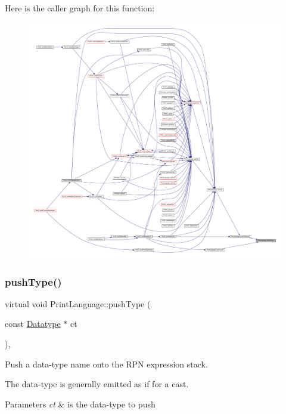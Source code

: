Here is the caller graph for this function\+:
\nopagebreak
\begin{figure}[H]
\begin{center}
\leavevmode
\includegraphics[width=350pt]{class_print_language_a481c41c176f1b5edea4e984997243f43_icgraph}
\end{center}
\end{figure}
\mbox{\label{class_print_language_a4bd65e5a27a60ab1b5590673c6396a4f}} 
\subsubsection{\texorpdfstring{pushType()}{pushType()}}
{\footnotesize\ttfamily virtual void Print\+Language\+::push\+Type (\begin{DoxyParamCaption}\item[{const \mbox{\hyperlink{class_datatype}{Datatype}} $\ast$}]{ct }\end{DoxyParamCaption})\hspace{0.3cm}{\ttfamily [protected]}, {}}



Push a data-\/type name onto the R\+PN expression stack. 

The data-\/type is generally emitted as if for a cast. 
\begin{DoxyParams}{Parameters}
{\em ct} & is the data-\/type to push \\
\hline
\end{DoxyParams}


